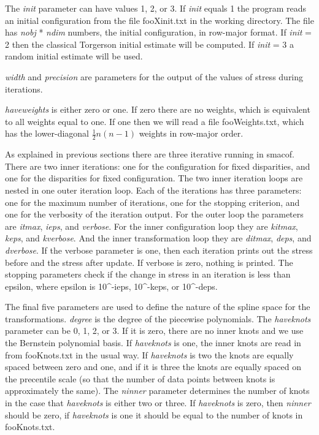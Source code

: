 \documentclass[
  12pt,
]{article}
\begin{document}
The \emph{init} parameter can have values 1, 2, or 3. If \emph{init} equals 1 the
program reads an initial configuration from the file fooXinit.txt in the
working directory. The file has \emph{nobj} * \emph{ndim} numbers, the initial
configuration, in row-major format. If \emph{init} = 2 then the classical
Torgerson initial estimate will be computed. If \emph{init} = 3 a random
initial estimate will be used.

\emph{width} and \emph{precision} are parameters for the output of the values of
stress during iterations.

\emph{haveweights} is either zero or one. If zero there are no weights, which
is equivalent to all weights equal to one. If one then we will read a
file fooWeights.txt, which has the lower-diagonal \(\frac12 n(n-1)\)
weights in row-major order.

As explained in previous sections there are three iterative running in
smacof. There are two inner iterations: one for the configuration for
fixed disparities, and one for the disparities for fixed configuration.
The two inner iteration loops are nested in one outer iteration loop.
Each of the iterations has three parameters: one for the maximum number
of iterations, one for the stopping criterion, and one for the verbosity
of the iteration output. For the outer loop the parameters are \emph{itmax},
\emph{ieps}, and \emph{verbose}. For the inner configuration loop they are
\emph{kitmax}, \emph{keps}, and \emph{kverbose}. And the inner transformation loop they
are \emph{ditmax}, \emph{deps}, and \emph{dverbose}. If the verbose parameter is one,
then each iteration prints out the stress before and the stress after
update. If verbose is zero, nothing is printed. The stopping parameters
check if the change in stress in an iteration is less than epsilon,
where epsilon is 10\^{}-ieps, 10\^{}-keps, or 10\^{}-deps.

The final five parameters are used to define the nature of the spline
space for the transformations. \emph{degree} is the degree of the piecewise
polynomials. The \emph{haveknots} parameter can be 0, 1, 2, or 3. If it is
zero, there are no inner knots and we use the Bernstein polynomial
basis. If \emph{haveknots} is one, the inner knots are read in from
fooKnots.txt in the usual way. If \emph{haveknots} is two the knots are
equally spaced between zero and one, and if it is three the knots are
equally spaced on the precentile scale (so that the number of data
points between knots is approximately the same). The \emph{ninner} parameter
determines the number of knots in the case that \emph{haveknots} is either
two or three. If \emph{haveknots} is zero, then \emph{ninner} should be zero, if
\emph{haveknots} is one it should be equal to the number of knots in
fooKnots.txt.
\end{document}
